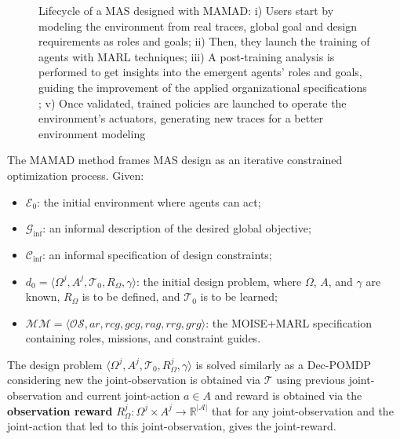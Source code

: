 \documentclass[pdflatex,sn-mathphys-num]{sn-jnl}%
\theoremstyle{thmstyleone}%
\theoremstyle{thmstyletwo}%
\theoremstyle{thmstylethree}%
\begin{document}
\begin{figure}[h!]
    \centering
    
    \caption{Lifecycle of a MAS designed with MAMAD: i) Users start by modeling the environment from real traces, global goal and design requirements as roles and goals; \quad ii) Then, they launch the training of agents with MARL techniques; \quad iii) A post-training analysis is performed to get insights into the emergent agents' roles and goals, guiding the improvement of the applied organizational specifications ; \quad v) Once validated, trained policies are launched to operate the environment's actuators, generating new traces for a better environment modeling}
    \label{fig:cycle}
\end{figure}

The MAMAD method frames MAS design as an iterative constrained optimization process. Given:
\begin{itemize}
    \item $\mathcal{E}_0$: the initial environment where agents can act;
    \item $\mathcal{G}_{\text{inf}}$: an informal description of the desired global objective;
    \item $\mathcal{C}_{\text{inf}}$: an informal specification of design constraints;
    \item $d_0 = \langle \Omega^j, A^j, \mathcal{T}_0, R_{\Omega}, \gamma \rangle$: the initial design problem, where $\Omega$, $A$, and $\gamma$ are known, $R_{\Omega}$ is to be defined, and $\mathcal{T}_0$ is to be learned;
    \item $\mathcal{MM} = \langle \mathcal{OS}, ar, rcg, gcg, rag, rrg, grg \rangle$: the MOISE+MARL specification containing roles, missions, and constraint guides.
\end{itemize}

The design problem $\langle \Omega^j, A^j, \mathcal{T}_0, R_{\Omega}^j, \gamma \rangle$ is solved similarly as a Dec-POMDP considering new the joint-observation is obtained via $\mathcal{T}$ using previous joint-observation and current joint-action $a \in A$ and reward is obtained via the \textbf{observation reward} $R^j_{\Omega}: \Omega^j \times A^j \rightarrow \mathbb{R}^{|\mathcal{A}|}$ that for any joint-observation and the joint-action that led to this joint-observation, gives the joint-reward.

\vspace{1em}
\end{document}
